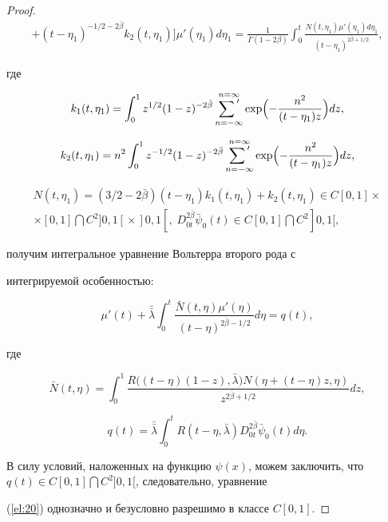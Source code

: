 \begin{proof}
\begin{multline*}
+(t-\eta_1)^{-1/2-2\bar{\beta}}k_2(t,\eta_1)]\mu'(\eta_1)d\eta_1=\frac{1}{\Gamma(1-2\beta)}\int_0^t\frac{N(t,\eta_1)\mu'

(\eta_1)d\eta_1}{(t-\eta_1)^{2\bar{\beta}+1/2}},

 \end{multline*}

где

$$k_1(t,\eta_1)=\int_0^1z^{1/2}(1-z)^{-2\bar{\beta}}\mathop{\sum{\rule{0mm}{10pt}'}} \limits_{n=-\infty}^{n=\infty}\exp\Bigl(-\frac{n^2}{(t-\eta_1)z}\Bigr)dz,$$

$$k_2(t,\eta_1)=n^2\int_0^1z^{-1/2}(1-z)^{-2\bar{\beta}}\mathop{\sum{\rule{0mm}{10pt}'}} \limits_{n=-\infty}^{n=\infty}\exp\Bigl(-\frac{n^2}{(t-\eta_1)z}\Bigr)dz,$$

\begin{multline*}N(t,\eta_1)=(3/2-2\bar{\beta})(t-\eta_1)k_1(t,\eta_1)+k_2(t,\eta_1)\in C[0, 1]\times

\\

\times[0, 1]\bigcap C^2]0, 1[{}\times{}]0, 1[{}, \;

D_{0t}^{2\bar{\beta}}\bar{\psi}_0(t)\in C[0, 1]\bigcap C^2]0, 1[{},

\end{multline*}

получим интегральное уравнение Вольтерра второго рода с

интегрируемой особенностью:

\begin{equation} \label{el:20}

\mu'(t)+\bar{\bar{\lambda}}\int_0^t\frac{\bar{N}(t,\eta)\mu'(\eta)}{(t-\eta)^{2\bar{\beta}-1/2}}d\eta=q(t),

\end{equation}

где

$$ \bar{N}(t,\eta)=\int_0^1\frac{R\bigl((t-\eta)(1-z),\bar{\lambda}\bigr)N(\eta+(t-\eta)z,\eta)}{z^{2\bar{\beta}+1/2}}dz,$$

$$ q(t)=\bar{\bar{\lambda}}\int_0^tR(t-\eta,\bar{\lambda})D_{0t}^{2\bar{\beta}}\bar{\psi}_0(t)d\eta.$$



В силу условий, наложенных на функцию $\psi(x)$, можем заключить, что $q(t)\in C[0, 1]\bigcap C^2]0, 1[$, следовательно, уравнение

(\ref{el:20}) однозначно и безусловно разрешимо в классе $C[0, 1]$.




\end{proof}
